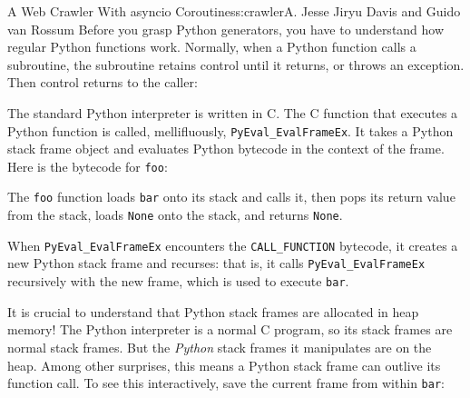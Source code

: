 \begin{aosachapter}{A Web Crawler With asyncio Coroutines}{s:crawler}{A. Jesse Jiryu Davis and Guido van Rossum}
Before you grasp Python generators, you have to understand how regular
Python functions work. Normally, when a Python function calls a
subroutine, the subroutine retains control until it returns, or throws
an exception. Then control returns to the caller:

\begin{Shaded}
\begin{Highlighting}[]
\NormalTok{>>> } 
\NormalTok{>>> } 
\end{Highlighting}
\end{Shaded}

The standard Python interpreter is written in C. The C function that
executes a Python function is called, mellifluously,
\texttt{PyEval\_EvalFrameEx}. It takes a Python stack frame object and
evaluates Python bytecode in the context of the frame. Here is the
bytecode for \texttt{foo}:

\begin{Shaded}
\begin{Highlighting}[]
\NormalTok{>>> } 
               
                \NormalTok{(}  
               
                \NormalTok{(}\NormalTok{)}
              
\end{Highlighting}
\end{Shaded}

The \texttt{foo} function loads \texttt{bar} onto its stack and calls
it, then pops its return value from the stack, loads \texttt{None} onto
the stack, and returns \texttt{None}.

When \texttt{PyEval\_EvalFrameEx} encounters the \texttt{CALL\_FUNCTION}
bytecode, it creates a new Python stack frame and recurses: that is, it
calls \texttt{PyEval\_EvalFrameEx} recursively with the new frame, which
is used to execute \texttt{bar}.


It is crucial to understand that Python stack frames are allocated in
heap memory! The Python interpreter is a normal C program, so its stack
frames are normal stack frames. But the \emph{Python} stack frames it
manipulates are on the heap. Among other surprises, this means a Python
stack frame can outlive its function call. To see this interactively,
save the current frame from within \texttt{bar}:


\end{aosachapter}
